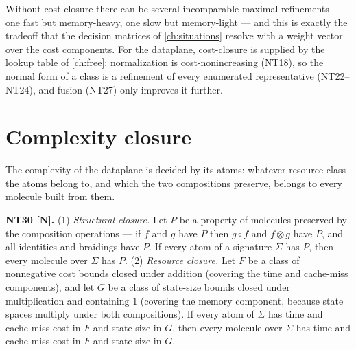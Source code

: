 \begin{remark}
Without cost-closure there can be several incomparable maximal refinements ---
one fast but memory-heavy, one slow but memory-light --- and this is exactly
the tradeoff that the decision matrices of \autoref{ch:situations} resolve
with a weight vector over the cost components. For the dataplane,
cost-closure is supplied by the lookup table of \autoref{ch:free}:
normalization is cost-nonincreasing (NT18), so the normal form of a class is a
refinement of every enumerated representative (NT22--NT24), and fusion (NT27)
only improves it further.
\end{remark}

\section{Complexity closure}\label{sec:enrich-closure}

The complexity of the dataplane is decided by its atoms: whatever resource
class the atoms belong to, and which the two compositions preserve, belongs to
every molecule built from them.

\begin{theorem}\label{nt:30}
\textbf{NT30 [N].} (1) \emph{Structural closure.} Let $P$ be a property of
molecules preserved by the composition operations --- if $f$ and $g$ have $P$
then $g \circ f$ and $f \otimes g$ have $P$, and all identities and braidings
have $P$. If every atom of a signature $\Sigma$ has $P$, then every molecule
over $\Sigma$ has $P$.
(2) \emph{Resource closure.} Let $F$ be a class of nonnegative cost bounds
closed under addition (covering the time and cache-miss components), and let
$G$ be a class of state-size bounds closed under multiplication and containing
$1$ (covering the memory component, because state spaces multiply under both
compositions). If every atom of $\Sigma$ has time and cache-miss cost in $F$
and state size in $G$, then every molecule over $\Sigma$ has time and
cache-miss cost in $F$ and state size in $G$.
\end{theorem}

